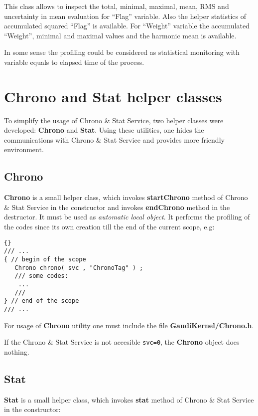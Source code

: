 \documentclass{lhcbnote}
\newcommand{\bftt}         {\ttfamily\bfseries}
\renewcommand{\it}         {\itshape}
\renewcommand{\tt}         {\ttfamily}
\begin{document}
This class allows to inspect the total, minimal, maximal,
mean, RMS and uncertainty in mean evaluation
for ``Flag'' variable. Also the helper statistics of
accumulated squared ``Flag'' is available.
For ``Weight'' variable the accumulated ``Weight'',
minimal and maximal values and the harmonic mean is available.


In some sense the profiling could be considered as
statistical monitoring with variable {\tt{Flag}} equals
to elapsed time of the process.

\chapter{{\bftt{Chrono}} and {\bftt{Stat}} helper classes}

 To simplify the usage  of Chrono \& Stat Service,
two helper classes were developed: {\bftt{Chrono}}
and {\bftt{Stat}}.
Using these utilities, one hides the communications with
Chrono \& Stat Service and provides more friendly environment.

\section{\bftt{Chrono}}
{\bftt{Chrono}} is a small helper class, which
invokes {\bftt{startChrono}} method of Chrono \& Stat Service
in the  constructor  and invokes {\bftt{endChrono}}
method in the  destructor. It must be used as
{\it automatic local object}.  It performs the profiling of the
codes since its own creation till the end of the current scope, e.g:

\begin{lstlisting}{}
/// ...
{ // begin of the scope
   Chrono chrono( svc , "ChronoTag" ) ;
   /// some codes:
    ...
   ///
} // end of the scope
/// ...
\end{lstlisting}

For usage of {\bftt{Chrono}} utility one must include the file
{\bftt{GaudiKernel/Chrono.h}}.

If the Chrono \& Stat Service  is not accesible \verb+svc=0+,
the {\bftt{Chrono}} object does nothing.

\section{{\bftt{Stat}}}

{\bftt{Stat}} is a small helper class, which
invokes {\bftt{stat}} method of Chrono \& Stat Service
in the  constructor:
\end{document}

